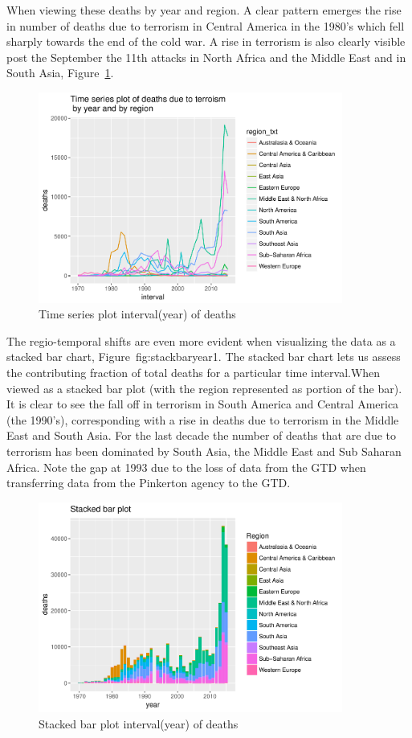 When viewing these deaths by  year and region. A clear pattern emerges the rise in number of deaths due to terrorism in Central America in the 1980's which fell
sharply towards the end of the cold war. A rise in terrorism is also clearly  visible post the September the 11th attacks in North Africa and the Middle East and in South Asia, Figure~\ref{fig:tseriesyear2}.

\begin{figure}[t]
\includegraphics[width=10cm]{Peters_experiment_markdown_files/figure-latex/unnamed-chunk-5-1.pdf}
\caption{Time series plot interval(year) of deaths}
\label{fig:tseriesyear2}
\centering
\end{figure}

The regio-temporal shifts are even more evident when visualizing the  data as a stacked bar chart, Figure~{fig:stackbaryear1}. The stacked bar chart lets us assess the contributing fraction of total deaths for a particular time interval.When viewed as a stacked bar plot (with the region represented as portion of the bar). It is clear to see the fall off in terrorism in South America and Central America (the 1990's), corresponding with a rise in deaths due to terrorism in the Middle East and South
Asia. For the last decade the number of deaths that are due to terrorism
has been dominated by South Asia, the Middle East and Sub Saharan
Africa. Note the gap at 1993 due to the loss of data from the GTD when transferring data from the Pinkerton agency to the GTD.

\begin{figure}[t]
\includegraphics[width=10cm]{Peters_experiment_markdown_files/figure-latex/unnamed-chunk-6-1.pdf}
\caption{Stacked bar plot interval(year) of deaths}
\label{fig:stackbaryear1}
\centering
\end{figure}

